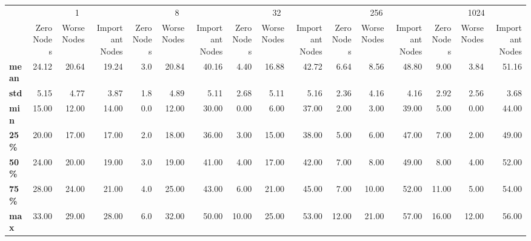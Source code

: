 \begin{tabular}{lrrrrrrrrrrrrrrr}
\toprule
{} & \multicolumn{3}{c}{1} & \multicolumn{3}{c}{8} & \multicolumn{3}{c}{32} & \multicolumn{3}{c}{256} & \multicolumn{3}{c}{1024} \\
{} & Zero Nodes & Worse Nodes & Important Nodes & Zero Nodes & Worse Nodes & Important Nodes & Zero Nodes & Worse Nodes & Important Nodes & Zero Nodes & Worse Nodes & Important Nodes & Zero Nodes & Worse Nodes & Important Nodes \\
\midrule
\textbf{mean} &      24.12 &       20.64 &           19.24 &        3.0 &       20.84 &           40.16 &       4.40 &       16.88 &           42.72 &       6.64 &        8.56 &           48.80 &       9.00 &        3.84 &           51.16 \\
\textbf{std } &       5.15 &        4.77 &            3.87 &        1.8 &        4.89 &            5.11 &       2.68 &        5.11 &            5.16 &       2.36 &        4.16 &            4.16 &       2.92 &        2.56 &            3.68 \\
\textbf{min } &      15.00 &       12.00 &           14.00 &        0.0 &       12.00 &           30.00 &       0.00 &        6.00 &           37.00 &       2.00 &        3.00 &           39.00 &       5.00 &        0.00 &           44.00 \\
\textbf{25\% } &      20.00 &       17.00 &           17.00 &        2.0 &       18.00 &           36.00 &       3.00 &       15.00 &           38.00 &       5.00 &        6.00 &           47.00 &       7.00 &        2.00 &           49.00 \\
\textbf{50\% } &      24.00 &       20.00 &           19.00 &        3.0 &       19.00 &           41.00 &       4.00 &       17.00 &           42.00 &       7.00 &        8.00 &           49.00 &       8.00 &        4.00 &           52.00 \\
\textbf{75\% } &      28.00 &       24.00 &           21.00 &        4.0 &       25.00 &           43.00 &       6.00 &       21.00 &           45.00 &       7.00 &       10.00 &           52.00 &      11.00 &        5.00 &           54.00 \\
\textbf{max } &      33.00 &       29.00 &           28.00 &        6.0 &       32.00 &           50.00 &      10.00 &       25.00 &           53.00 &      12.00 &       21.00 &           57.00 &      16.00 &       12.00 &           56.00 \\
\bottomrule
\end{tabular}
